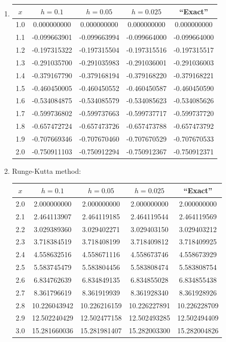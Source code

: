 \documentclass[openany]{book}
\newenvironment{sectionSolutions}{
 \begin{enumerate}[item-label={\thesection.\arabic{enumi}.}]
}{
 \end{enumerate}
}
\begin{document}
\begin{sectionSolutions}
\item
{\small
{}
\begin{tabular}{S[table-format=1.1] *4{S[table-format=-1.9]} }\toprule
{$x$}&{$h=0.1$}&{$h=0.05$}&{$h=0.025$}&{``Exact''}\\  &  0.000000000 &  0.000000000 &  0.000000000 &  0.000000000 \\
1.1 & -0.099663901 & -0.099663994 & -0.099664000 & -0.099664000 \\
1.2 & -0.197315322 & -0.197315504 & -0.197315516 & -0.197315517 \\
1.3 & -0.291035700 & -0.291035983 & -0.291036001 & -0.291036003 \\
1.4 & -0.379167790 & -0.379168194 & -0.379168220 & -0.379168221 \\
1.5 & -0.460450005 & -0.460450552 & -0.460450587 & -0.460450590 \\
1.6 & -0.534084875 & -0.534085579 & -0.534085623 & -0.534085626 \\
1.7 & -0.599736802 & -0.599737663 & -0.599737717 & -0.599737720 \\
1.8 & -0.657472724 & -0.657473726 & -0.657473788 & -0.657473792 \\
1.9 & -0.707669346 & -0.707670460 & -0.707670529 & -0.707670533 \\
2.0 & -0.750911103 & -0.750912294 & -0.750912367 & -0.750912371 \\
\bottomrule
\end{tabular}}\bigskip

\item
{\small Runge-Kutta method:
\begin{tabular}{S[table-format=1.1] *4{S[table-format=2.9]} }\toprule
{$x$}&{$h=0.1$}&{$h=0.05$}&{$h=0.025$}&{``Exact''}\\  &  2.000000000 &  2.000000000 &  2.000000000 &  2.000000000 \\
2.1 &  2.464113907 &  2.464119185 &  2.464119544 &  2.464119569 \\
2.2 &  3.029389360 &  3.029402271 &  3.029403150 &  3.029403212 \\
2.3 &  3.718384519 &  3.718408199 &  3.718409812 &  3.718409925 \\
2.4 &  4.558632516 &  4.558671116 &  4.558673746 &  4.558673929 \\
2.5 &  5.583745479 &  5.583804456 &  5.583808474 &  5.583808754 \\
2.6 &  6.834762639 &  6.834849135 &  6.834855028 &  6.834855438 \\
2.7 &  8.361796619 &  8.361919939 &  8.361928340 &  8.361928926 \\
2.8 & 10.226043942 & 10.226216159 & 10.226227891 & 10.226228709 \\
2.9 & 12.502240429 & 12.502477158 & 12.502493285 & 12.502494409 \\
3.0 & 15.281660036 & 15.281981407 & 15.282003300 & 15.282004826 \\
\bottomrule
\end{tabular}}\bigskip


\end{sectionSolutions}
\end{document}
